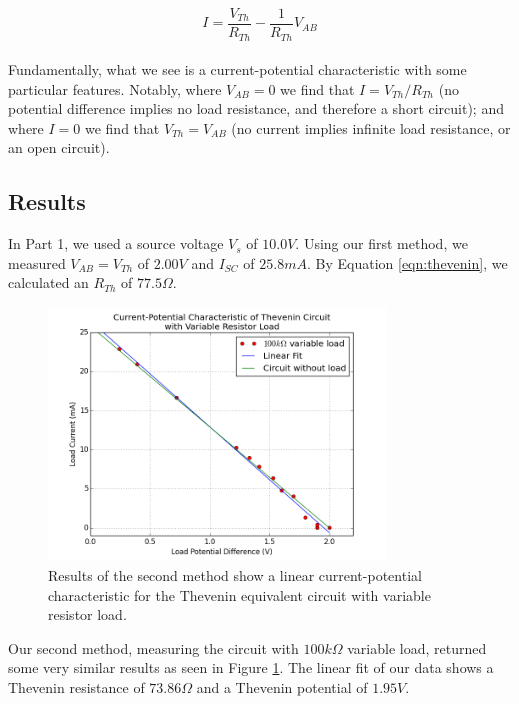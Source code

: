 \documentclass[11pt]{article}
\begin{document}
    \begin{equation}
        \label{eqn:theveninLoad}
        I = \frac{V_{Th}}{R_{Th}} - \frac{1}{R_{Th}} V_{AB}
    \end{equation} \\
    
    Fundamentally, what we see is a current-potential characteristic with some particular features. Notably, where \(V_{AB} = 0\) we find that \(I = V_{Th} / R_{Th}\) (no potential difference implies no load resistance, and therefore a short circuit); and where \(I = 0\) we find that \(V_{Th} = V_{AB}\) (no current implies infinite load resistance, or an open circuit). \\

\subsection{Results}
    In Part 1, we used a source voltage \(V_s\) of \(10.0 V\). Using our first method, we measured \(V_{AB} = V_{Th}\) of \(2.00 V\) and \(I_{SC}\) of \(25.8 mA\). By Equation \ref{eqn:thevenin}, we calculated an \(R_{Th}\) of \(77.5 \Omega\). \\
    
    \begin{figure}[H]
        \centering
        \includegraphics[width=0.8\textwidth]{fig_TheveninWithLoad.png}
        \caption{Results of the second method show a linear current-potential characteristic for the Thevenin equivalent circuit with variable resistor load.}
        \label{fig:fig_TheveninWithLoad}
    \end{figure}

    Our second method, measuring the circuit with \(100 k\Omega\) variable load, returned some very similar results as seen in Figure \ref{fig:fig_TheveninWithLoad}. The linear fit of our data shows a Thevenin resistance of \(73.86 \Omega\) and a Thevenin potential of \(1.95 V\). \\
    
\end{document}
